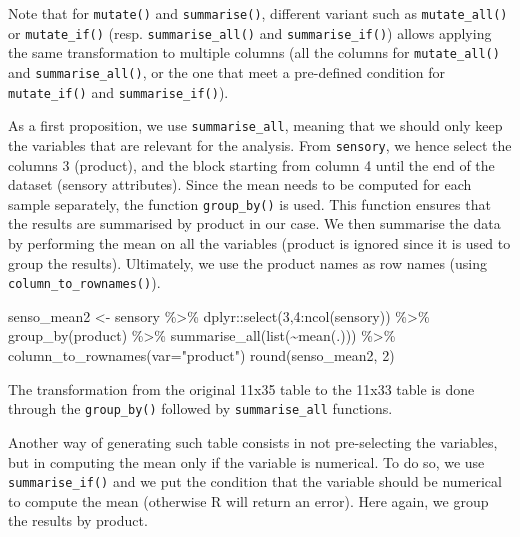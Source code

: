 \documentclass[
]{book}
\newenvironment{Shaded}{\begin{snugshade}}{\end{snugshade}}
\newcommand{\AttributeTok}[1]{\textcolor[rgb]{0.77,0.63,0.00}{#1}}
\newcommand{\DecValTok}[1]{\textcolor[rgb]{0.00,0.00,0.81}{#1}}
\newcommand{\FunctionTok}[1]{\textcolor[rgb]{0.00,0.00,0.00}{#1}}
\newcommand{\NormalTok}[1]{#1}
\newcommand{\OtherTok}[1]{\textcolor[rgb]{0.56,0.35,0.01}{#1}}
\newcommand{\SpecialCharTok}[1]{\textcolor[rgb]{0.00,0.00,0.00}{#1}}
\newcommand{\StringTok}[1]{\textcolor[rgb]{0.31,0.60,0.02}{#1}}
\begin{document}
Note that for \texttt{mutate()} and \texttt{summarise()}, different variant such as \texttt{mutate\_all()} or \texttt{mutate\_if()} (resp. \texttt{summarise\_all()} and \texttt{summarise\_if()}) allows applying the same transformation to multiple columns (all the columns for \texttt{mutate\_all()} and \texttt{summarise\_all()}, or the one that meet a pre-defined condition for \texttt{mutate\_if()} and \texttt{summarise\_if()}).

As a first proposition, we use \texttt{summarise\_all}, meaning that we should only keep the variables that are relevant for the analysis. From \texttt{sensory}, we hence select the columns 3 (product), and the block starting from column 4 until the end of the dataset (sensory attributes).
Since the mean needs to be computed for each sample separately, the function \texttt{group\_by()} is used. This function ensures that the results are summarised by product in our case. We then summarise the data by performing the mean on all the variables (product is ignored since it is used to group the results).
Ultimately, we use the product names as row names (using \texttt{column\_to\_rownames()}).

\begin{Shaded}
\begin{Highlighting}[]
\NormalTok{senso\_mean2 }\OtherTok{\textless{}{-}}\NormalTok{ sensory }\SpecialCharTok{\%\textgreater{}\%} 
\NormalTok{  dplyr}\SpecialCharTok{::}\FunctionTok{select}\NormalTok{(}\DecValTok{3}\NormalTok{,}\DecValTok{4}\SpecialCharTok{:}\FunctionTok{ncol}\NormalTok{(sensory)) }\SpecialCharTok{\%\textgreater{}\%} 
  \FunctionTok{group\_by}\NormalTok{(product) }\SpecialCharTok{\%\textgreater{}\%} 
  \FunctionTok{summarise\_all}\NormalTok{(}\FunctionTok{list}\NormalTok{(}\SpecialCharTok{\textasciitilde{}}\FunctionTok{mean}\NormalTok{(.))) }\SpecialCharTok{\%\textgreater{}\%} 
  \FunctionTok{column\_to\_rownames}\NormalTok{(}\AttributeTok{var=}\StringTok{"product"}\NormalTok{)}
\FunctionTok{round}\NormalTok{(senso\_mean2, }\DecValTok{2}\NormalTok{)}
\end{Highlighting}
\end{Shaded}

The transformation from the original 11x35 table to the 11x33 table is done through the \texttt{group\_by()} followed by \texttt{summarise\_all} functions.

Another way of generating such table consists in not pre-selecting the variables, but in computing the mean only if the variable is numerical. To do so, we use \texttt{summarise\_if()} and we put the condition that the variable should be numerical to compute the mean (otherwise R will return an error). Here again, we group the results by product.
\end{document}
